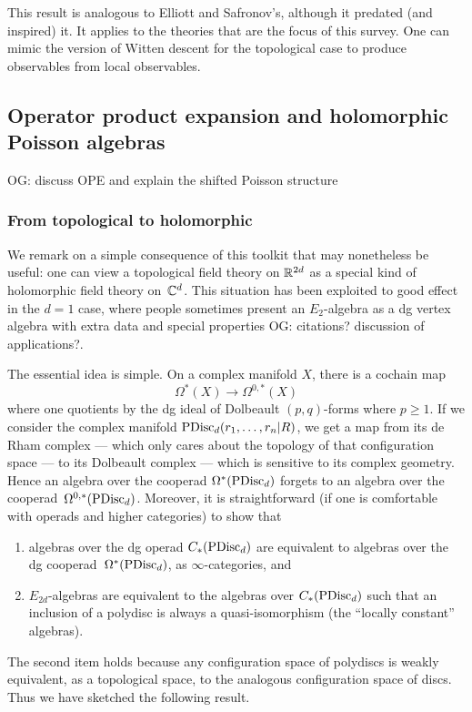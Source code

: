 \documentclass[11pt]{amsart}
\def\owen#1{{\textcolor{violet!65!black}{OG: {#1}}}}
\begin{document}
This result is analogous to Elliott and Safronov's, although it predated (and inspired) it.
It applies to the theories that are the focus of this survey.
One can mimic the version of Witten descent for the topological case to produce observables from local observables.

\subsection{Operator product expansion and holomorphic Poisson algebras}

\owen{discuss OPE and explain the shifted Poisson structure}

\subsubsection{From topological to holomorphic}

We remark on a simple consequence of this toolkit that may nonetheless be useful:
one can view a topological field theory on $\mathbb R^{2d}$ as a special kind of holomorphic field theory on~$\mathbb C^{d}$.
This situation has been exploited to good effect in the $d=1$ case,
where people sometimes present an $E_2$-algebra as a dg vertex algebra with extra data and special properties \owen{citations? discussion of applications?}.

The essential idea is simple.
On a complex manifold $X$, there is a cochain map
\[
\Omega^*(X) \to \Omega^{0,*}(X)
\]
where one quotients by the dg ideal of Dolbeault $(p,q)$-forms where $p \geq 1$.
If we consider the complex manifold ${\rm PDisc}_d(r_1,\ldots,r_n|R)$, 
we get a map from its de Rham complex --- which only cares about the topology of that configuration space --- to its Dolbeault complex --- which is sensitive to its complex geometry.
Hence an algebra over the cooperad $\Omega^*({\rm PDisc}_d)$ forgets to an algebra over the cooperad~$\Omega^{0,*}({\rm PDisc}_d)$.
Moreover, it is straightforward (if one is comfortable with operads and higher categories) to show that 
\begin{enumerate}
\item algebras over the dg operad $C_*({\rm PDisc}_d)$ are equivalent to algebras over the dg cooperad~$\Omega^*({\rm PDisc}_d)$, as $\infty$-categories, and
\item $E_{2d}$-algebras are equivalent to the algebras over $C_*({\rm PDisc}_d)$ such that an inclusion of a polydisc is always a quasi-isomorphism (the ``locally constant'' algebras).
\end{enumerate}
The second item holds because any configuration space of polydiscs is weakly equivalent, as a topological space, to the analogous configuration space of discs.
Thus we have sketched the following result.
\end{document}
